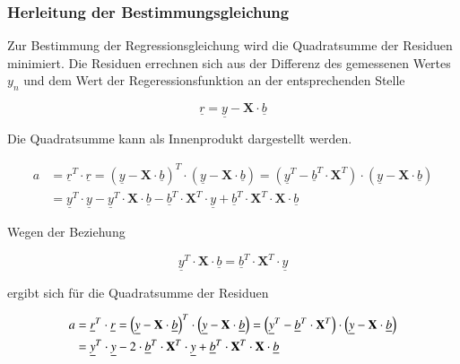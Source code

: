 \subsubsection{Herleitung der Bestimmungsgleichung}

\noindent Zur Bestimmung der Regressionsgleichung wird die Quadratsumme der Residuen minimiert. Die Residuen errechnen sich aus der Differenz des gemessenen Wertes $y_{n}$ und dem Wert der Regeressionsfunktion an der entsprechenden Stelle

\begin{equation}\label{eq:thirteensix}
\underline{r}=\underline{y}-\mathbf{X}\cdot \underline{b}
\end{equation}

\noindent Die Quadratsumme kann als Innenprodukt dargestellt werden.

\begin{equation}\label{eq:thirteenseven}
\begin{split}
a & =\underline{r}^{T} \cdot \underline{r}=\left(\underline{y}-\mathbf{X}\cdot \underline{b}\right)^{T} \cdot \left(\underline{y}-\mathbf{X}\cdot \underline{b}\right)=\left(\underline{y}^{T} -\underline{b}^{T} \cdot \mathbf{X}^{T} \right)\cdot \left(\underline{y}-\mathbf{X}\cdot \underline{b}\right) \\ 
& = \underline{y}^{T} \cdot \underline{y}-\underline{y}^{T} \cdot \mathbf{X}\cdot \underline{b}-\underline{b}^{T} \cdot \mathbf{X}^{T} \cdot \underline{y}+\underline{b}^{T} \cdot \mathbf{X}^{T} \cdot \mathbf{X}\cdot \underline{b}    
\end{split}
\end{equation}

\noindent Wegen der Beziehung

\begin{equation}\label{eq:thirteeneight}
\underline{y}^{T} \cdot \mathbf{X}\cdot \underline{b}=\underline{b}^{T} \cdot \mathbf{X}^{T} \cdot \underline{y}
\end{equation}

\noindent ergibt sich f\"{u}r die Quadratsumme der Residuen

\begin{equation}\label{eq:thirteennine}
\begin{split}
a & = \underline{r}^{T} \cdot \underline{r}=\left(\underline{y}-\mathbf{X}\cdot \underline{b}\right)^{T} \cdot \left(\underline{y}-\mathbf{X}\cdot \underline{b}\right)=\left(\underline{y}^{T} -\underline{b}^{T} \cdot \mathbf{X}^{T} \right)\cdot \left(\underline{y}-\mathbf{X}\cdot \underline{b}\right) \\ 
& = \underline{y}^{T} \cdot \underline{y}-2\cdot \underline{b}^{T} \cdot \mathbf{X}^{T} \cdot \underline{y}+\underline{b}^{T} \cdot \mathbf{X}^{T} \cdot \mathbf{X}\cdot \underline{b}
\end{split}
\end{equation}

